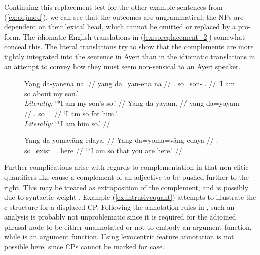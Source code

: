 Continuing this replacement test for the other example sentences from
(\ref{ex:adjmod}), we can see that the outcomes are ungrammatical; the NPs are
dependent on their lexical head, which cannot be omitted or replaced by a
pro-form. The idiomatic English translations in (\ref{ex:soreplacement_2})
somewhat conceal this. The literal translations try to show that the
complements are more tightly integrated into the sentence in Ayeri than in the
idiomatic translations in an attempt to convey how they must seem non-sensical
to an Ayeri speaker.

\begin{figure}
\pex\label{ex:soreplacement_2}
\a\label{ex:soreplacement_2_1}\ljudge*\begingl
	\gla Yang da-yanena nā. //
	\glb yang da=yan-ena nā //
	\glc \Fsg{}.\Aarg{} so=son-\Gen{} \Fsg{}.\Gen{} //
	\glft `I am so about my son.'\\
		\textit{Literally:} `*I am my son's so.' //
\endgl
\a\label{ex:soreplacement_2_2}\ljudge*\begingl
	\gla Yang da-yayam. //
	\glb yang da=yayam //
	\glc \Fsg{}.\Aarg{} so=\TsgM{}.\Dat{} //
	\glft `I am so for him.' \\
		\textit{Literally:} `*I am him so.' //
\endgl

\a\label{ex:soreplacement_2_3}\ljudge*\begingl
	\gla Yang da-yomavāng edaya. //
	\glb Yang da=yoma=vāng edaya //
	\glc \Fsg{}.\Aarg{} so=exist=\Second{}.\Aarg{} here //
	\glft `*I am so that you are here.' //
\endgl
\xe
\end{figure}


Further complications arise with regards to complementation in that non-clitic
quantifiers like  cause a complement of an adjective
to be pushed further to the right. This may be treated as extraposition of the
complement, and is possibly due to syntactic weight \citep{wechsler2009}.
Example (\ref{ex:intrusivequant}) attempts to illustrate the c-structure for a
displaced CP. Following the annotation rules in \citet[107]{bresnan2016}, such
an analysis is probably not unproblematic since it is required for the adjoined
phrasal node to be either unannotated or not to embody an argument function,
while \Comp{} is an argument function. Using lexocentric feature annotation is
not possible here, since CPs cannot be marked for case.

